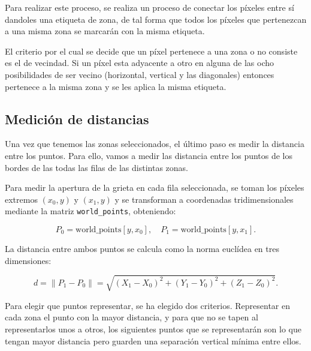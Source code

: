 Para realizar este proceso, se realiza un proceso de conectar los píxeles entre sí dandoles una etiqueta de zona, de tal forma que todos los píxeles que pertenezcan a una misma zona se marcarán con la misma etiqueta.

El criterio por el cual se decide que un píxel pertenece a una zona o no consiste es el de vecindad. Si un píxel esta adyacente a otro en alguna de las ocho posibilidades de ser vecino (horizontal, vertical y las diagonales) entonces pertenece a la misma zona y se les aplica la misma etiqueta.


\subsection{Medición de distancias}
Una vez que tenemos las zonas seleccionados, el último paso es medir la distancia entre los puntos. Para ello, vamos a medir las distancia entre los puntos de los bordes de las todas las filas de las distintas zonas.

Para medir la apertura de la grieta en cada fila seleccionada, se toman los píxeles extremos 
\((x_0, y)\) y \((x_1, y)\) y se transforman a coordenadas tridimensionales mediante la matriz 
\texttt{world\_points}, obteniendo:

\[
P_0 = \text{world\_points}[y, x_0], \quad 
P_1 = \text{world\_points}[y, x_1].
\]

La distancia entre ambos puntos se calcula como la norma euclídea en tres dimensiones:

\[
d = \lVert P_1 - P_0 \rVert 
= \sqrt{(X_1 - X_0)^2 + (Y_1 - Y_0)^2 + (Z_1 - Z_0)^2}.
\]

Para elegir que puntos representar, se ha elegido dos criterios. Representar en cada zona el punto con la mayor distancia, y para que no se tapen al representarlos unos a otros, los siguientes puntos que se representarán son lo que tengan mayor distancia pero guarden una separación vertical mínima entre ellos.


